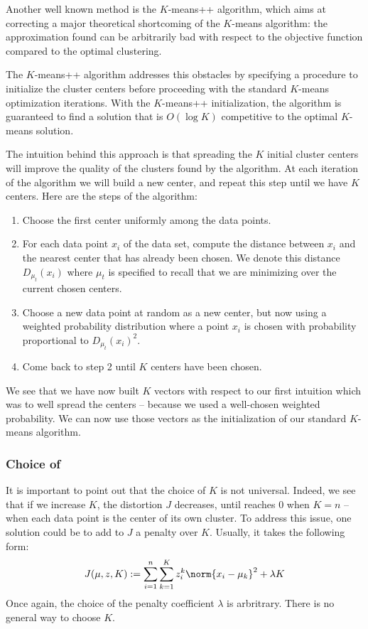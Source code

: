 \documentclass[toc, titlepaged]{../cs-classes/cs-classes}
\begin{document}
Another well known method is the $K$-means++ algorithm, which aims at correcting a major theoretical shortcoming of the $K$-means algorithm: the approximation found can be arbitrarily bad with respect to the objective function compared to the optimal clustering.

The $K$-means++ algorithm addresses this obstacles by specifying a procedure to initialize the cluster centers before proceeding with the standard $K$-means optimization iterations. With the $K$-means++ initialization, the algorithm is guaranteed to find a solution that is $O(\log K)$ competitive to the optimal $K$-means solution.

The intuition behind this approach is that spreading the $K$ initial cluster centers will improve the quality of the clusters found by the algorithm. At each iteration of the algorithm we will build a new center, and repeat this step until we have $K$ centers. Here are the steps of the algorithm:
\begin{enumerate}
    \item Choose the first center uniformly among the data points.
    \item For each data point $x_i$ of the data set, compute the distance between $x_i$ and the nearest center that has already been chosen. We denote this distance $D_{\mu_t}(x_i)$ where $\mu_t$ is specified to recall that we are minimizing over the current chosen centers.
    \item Choose a new data point at random as a new center, but now using a weighted probability distribution where a point $x_i$ is chosen with probability proportional to $D_{\mu_t}(x_i)^2$.
    \item Come back to step 2 until $K$ centers have been chosen.
\end{enumerate}

We see that we have now built $K$ vectors with respect to our first intuition which was to well spread the centers -- because we used a well-chosen weighted probability. We can now use those vectors as the initialization of our standard $K$-means algorithm.

\subsubsection{Choice of }
It is important to point out that the choice of $K$ is not universal. Indeed, we see that if we increase $K$, the distortion $J$ decreases, until reaches $0$ when $K=n$ --  when each data point is the center of its own cluster. To address this issue, one solution could be to add to $J$ a penalty over $K$. Usually, it takes the following form:
\begin{equation*}
    J(\mu, z, K) := \sum_{i=1}^n\sum_{k=1}^K z_i^k\norm{x_i-\mu_k}^2+\lambda K
\end{equation*}
Once again, the choice of the penalty coefficient $\lambda$ is arbritrary. There is no general way to choose $K$.
\end{document}
